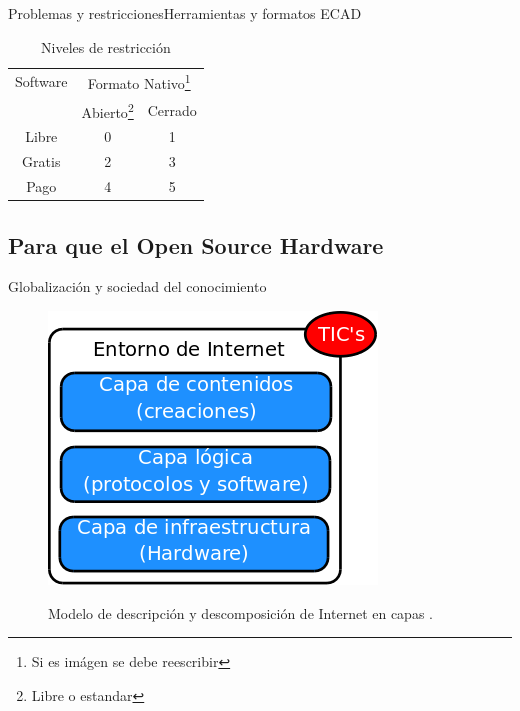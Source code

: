 \documentclass{beamer}
\begin{document}
\begin{frame}{Problemas y restricciones}{Herramientas y formatos ECAD}
  \begin{table}
    \begin{tabular}{|c|c|c|}
      \hline
      Software & \multicolumn{2}{c|}{Formato Nativo\footnote{Si es imágen se debe reescribir}}\\
       & Abierto\footnote{Libre o estandar} & Cerrado\\
      \hline
      Libre & 0 & 1\\
      Gratis & 2 & 3\\
      Pago & 4 & 5\\
      \hline
    \end{tabular}
    \caption{Niveles de restricción}
    \label{tab:niveles}
  \end{table}
\end{frame}

\subsection{Para que el Open Source Hardware}

\begin{frame}{Globalización y sociedad del conocimiento}
  \begin{figure}
    \includegraphics[scale=0.3]{img/internet}
    \label{fig:internet}
    \caption{Modelo de descripción y descomposición de Internet en capas \cite{Bercelli}.}
  \end{figure}
\end{frame}
\end{document}
